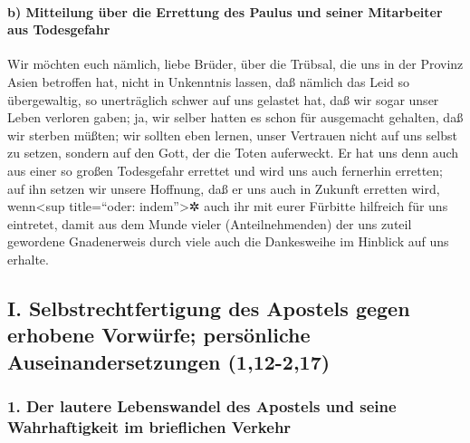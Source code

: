 \hypertarget{b-mitteilung-uxfcber-die-errettung-des-paulus-und-seiner-mitarbeiter-aus-todesgefahr}{%
\paragraph{b) Mitteilung über die Errettung des Paulus und seiner
Mitarbeiter aus
Todesgefahr}\label{b-mitteilung-uxfcber-die-errettung-des-paulus-und-seiner-mitarbeiter-aus-todesgefahr}}

 Wir möchten euch nämlich, liebe Brüder, über die Trübsal,
die uns in der Provinz Asien betroffen hat, nicht in Unkenntnis lassen,
daß nämlich das Leid so übergewaltig, so unerträglich schwer auf uns
gelastet hat, daß wir sogar unser Leben verloren gaben; 
ja, wir selber hatten es schon für ausgemacht gehalten, daß wir sterben
müßten; wir sollten eben lernen, unser Vertrauen nicht auf uns selbst zu
setzen, sondern auf den Gott, der die Toten auferweckt. 
Er hat uns denn auch aus einer so großen Todesgefahr errettet und wird
uns auch fernerhin erretten; auf ihn setzen wir unsere Hoffnung, daß er
uns auch in Zukunft erretten wird,  wenn\textless sup
title=``oder: indem''\textgreater✲ auch ihr mit eurer Fürbitte hilfreich
für uns eintretet, damit aus dem Munde vieler (Anteilnehmenden) der uns
zuteil gewordene Gnadenerweis durch viele auch die Dankesweihe im
Hinblick auf uns erhalte.

\hypertarget{i.-selbstrechtfertigung-des-apostels-gegen-erhobene-vorwuxfcrfe-persuxf6nliche-auseinandersetzungen-112-217}{%
\subsection{I. Selbstrechtfertigung des Apostels gegen erhobene
Vorwürfe; persönliche Auseinandersetzungen
(1,12-2,17)}\label{i.-selbstrechtfertigung-des-apostels-gegen-erhobene-vorwuxfcrfe-persuxf6nliche-auseinandersetzungen-112-217}}

\hypertarget{der-lautere-lebenswandel-des-apostels-und-seine-wahrhaftigkeit-im-brieflichen-verkehr}{%
\subsubsection{1. Der lautere Lebenswandel des Apostels und seine
Wahrhaftigkeit im brieflichen
Verkehr}\label{der-lautere-lebenswandel-des-apostels-und-seine-wahrhaftigkeit-im-brieflichen-verkehr}}

